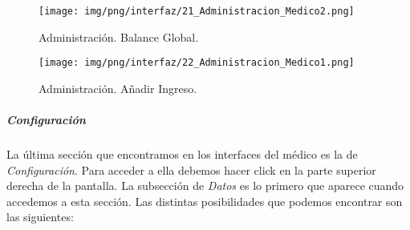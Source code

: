 \documentclass[a4paper,oneside,11pt]{book}
\begin{document}
		
		\begin{figure}[H]
		  \centering
		    \texttt{[image: img/png/interfaz/21\_Administracion\_Medico2.png]}
		  \caption{Administración. Balance Global.}
		  \label{fig:iu_administracion_balance}
		\end{figure}
		
		\begin{figure}[H]
		  \centering
		    \texttt{[image: img/png/interfaz/22\_Administracion\_Medico1.png]}
		  \caption{Administración. Añadir Ingreso.}
		  \label{fig:iu_administracion_ingreso}
		\end{figure}
				
		
		\subparagraph{Configuración} %
		\label{par:medico_configuracion}
		
		La última sección que encontramos en los interfaces del médico es la de \textit{Configuración}. Para acceder a ella debemos hacer click en la parte superior derecha de la pantalla. La subsección de \textit{Datos} es lo primero que aparece cuando accedemos a esta sección. Las distintas posibilidades que podemos encontrar son las siguientes:
		
\end{document}
